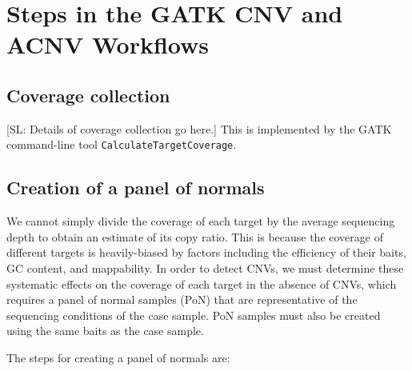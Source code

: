 \documentclass[nofootinbib,amssymb,amsmath]{revtex4}
\def\SL#1{{\color [rgb]{0,0,0.8} [SL: #1]}}
\begin{document}
\section{Steps in the GATK CNV and ACNV Workflows} \label{recapseg-overview}

\subsection{Coverage collection}

\SL{Details of coverage collection go here.}  This is implemented by the GATK command-line tool \texttt{CalculateTargetCoverage}.

\subsection{Creation of a panel of normals}
We cannot simply divide the coverage of each target by the average sequencing depth to obtain an estimate of its copy ratio.  This is because the coverage of different targets is heavily-biased by factors including the efficiency of their baits, GC content, and mappability.  In order to detect CNVs, we must determine these systematic effects on the coverage of each target in the absence of CNVs, which requires a panel of normal samples (PoN) that are representative of the sequencing conditions of the case sample.  PoN samples must also be created using the same baits as the case sample.

The steps for creating a panel of normals are:
\end{document}
